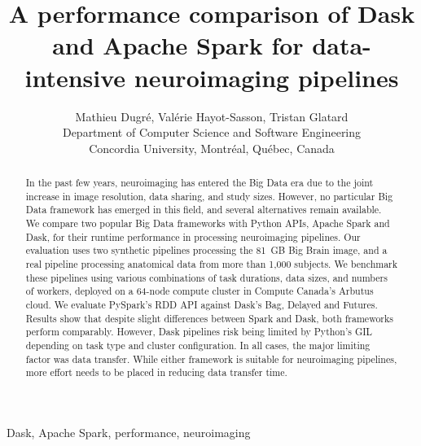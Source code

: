 \documentclass[conference]{IEEEtran}
\begin{document}
\title{A performance comparison of Dask and Apache Spark for data-intensive neuroimaging pipelines}

\author{Mathieu Dugr\'e, Val\'erie Hayot-Sasson, Tristan Glatard\\
Department of Computer Science and Software Engineering\\
Concordia University, Montr\'eal, Qu\'ebec, Canada 
\vspace*{0.8cm} %
}

\maketitle

\begin{abstract}

In the past few years, neuroimaging has entered the Big Data era due to the
joint increase in image resolution, data sharing, and study sizes. However,
no particular Big Data framework has emerged in this field, and several
alternatives remain available. We compare two popular Big Data frameworks
with Python APIs, Apache Spark and Dask, for their runtime performance in
processing neuroimaging pipelines. Our evaluation uses two synthetic
pipelines processing the 81~GB Big Brain image, and a real pipeline
processing anatomical data from more than 1,000 subjects. We benchmark these pipelines using
 various combinations of task durations, data sizes, and numbers of workers,
deployed on a 64-node compute cluster in Compute Canada's Arbutus
cloud. We evaluate PySpark's RDD API against Dask's Bag, Delayed and Futures.
Results show that despite slight differences between Spark and Dask, both
frameworks perform comparably. However, Dask pipelines risk being limited
by Python's GIL depending on task type and cluster configuration. In all
cases, the major limiting factor was data transfer. While either framework
is suitable for neuroimaging pipelines, more effort needs to be placed in
reducing data transfer time.
\end{abstract}

\begin{IEEEkeywords}
Dask, Apache Spark, performance, neuroimaging
\end{IEEEkeywords}
\end{document}
